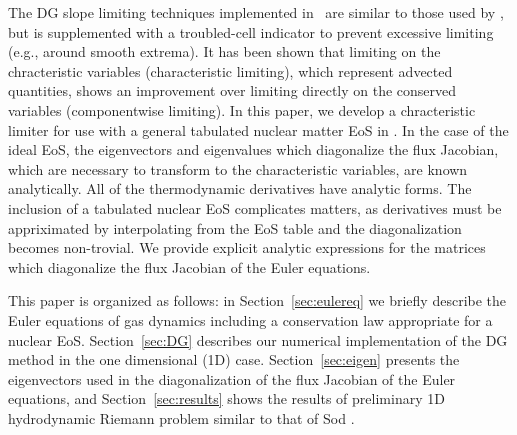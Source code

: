 \documentclass[onecolumn]{aastex62}
\begin{document}
The DG slope limiting techniques implemented in \thornado\, are similar to those
used by \cite{schaal:2015a}, but is supplemented with a troubled-cell
indicator \citep{fu:2017} to prevent excessive limiting (e.g., around smooth extrema).
It has been shown \citep[see e.g.,][]{schaal:2015a, cockburn:1998, cockburn:1989}
that limiting on the chracteristic variables (characteristic limiting),
which represent advected quantities, shows an improvement over limiting
directly on the conserved variables (componentwise limiting).
In this paper, we develop a chracteristic
limiter for use with a general tabulated nuclear matter EoS in \thornado.
In the case of the ideal EoS, the eigenvectors and eigenvalues which diagonalize
the flux Jacobian, which are necessary to transform to the characteristic variables,
are known analytically. All of the thermodynamic derivatives have analytic forms.
The inclusion of a tabulated nuclear EoS complicates matters, as derivatives
must be appriximated by interpolating from the EoS table and the diagonalization
becomes non-trovial.
We provide explicit analytic expressions for the matrices which diagonalize the
flux Jacobian of the Euler equations.

This paper is organized as follows: in Section~\ref{sec:eulereq} we briefly
describe the Euler equations of gas dynamics including a conservation law
appropriate for a nuclear EoS. Section~\ref{sec:DG} describes our
numerical implementation of the DG method in the one dimensional (1D) case.
Section~\ref{sec:eigen} presents the eigenvectors used in the diagonalization
of the flux Jacobian of the Euler equations, and Section~\ref{sec:results}
shows the results of preliminary 1D hydrodynamic Riemann problem similar to that
of Sod \citep{sod:1978}.
\end{document}
